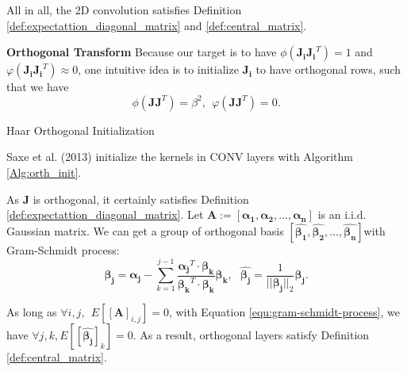 \documentclass[10pt,journal,compsoc]{IEEEtran}
\newcommand{\modify}[1]{{ #1}}
\begin{document}
All in all, the 2D convolution satisfies Definition \ref{def:expectattion_diagonal_matrix} and \ref{def:central_matrix}.

\textbf{Orthogonal Transform} \modify{Because our target is to have $\phi(\mathbf{J_iJ_i}^T)=1$ and $\varphi(\mathbf{J_iJ_i}^T)\approx 0$, one intuitive idea is to initialize $\mathbf{J_i}$ to have orthogonal rows, such that we have}
\begin{equation}
    \phi(\mathbf{JJ}^T)=\beta^2,~~\varphi(\mathbf{JJ}^T)=0.
\label{equ:phi_orth}
\end{equation}
\begin{algorithm}[ht]
\DontPrintSemicolon
 \caption{Haar Orthogonal Initialization}
 \label{Alg:orth_init}
\end{algorithm} Saxe et al. (2013) \cite{saxe2013exact} initialize the kernels in CONV layers with Algorithm \ref{Alg:orth_init}.

As $\mathbf{J}$ is orthogonal, it certainly satisfies Definition \ref{def:expectattion_diagonal_matrix}. Let $\mathbf{A}:= [\mathbf{\alpha_1}, \mathbf{\alpha_2}, ..., \mathbf{\alpha_n}]$ is an i.i.d. Gaussian matrix. We can get a group of orthogonal basis $[\hat{\mathbf{\beta_1}}, \hat{\mathbf{\beta_2}}, ..., \hat{\mathbf{\beta_n}}]$with Gram-Schmidt process:
\begin{equation}
    \mathbf{\beta_j} = \mathbf{\alpha_j} - \sum_{k=1}^{j-1}\frac{\mathbf{\alpha_j}^T\cdot\mathbf{\beta_k}}{\mathbf{\beta_k}^T\cdot\mathbf{\beta_k}}\mathbf{\beta_k},~~~\hat{\mathbf{\beta_j}} = \frac{1}{||\mathbf{\beta_j}||_2}\mathbf{\beta_j}.
\label{equ:gram-schmidt-process}
\end{equation}

As long as $\forall i,j,~~E\left[\left[\mathbf{A}\right]_{i,j}\right]=0$, with Equation \eqref{equ:gram-schmidt-process}, we have $\forall j,k, E\left[\left[\hat{\mathbf{\beta_j}}\right]_{k}\right]=0$. As a result, orthogonal layers satisfy Definition \ref{def:central_matrix}.
\end{document}
